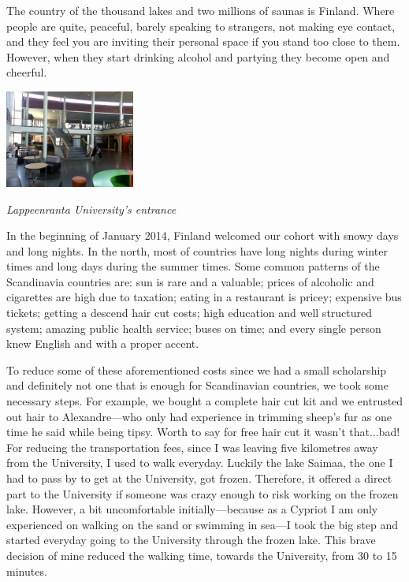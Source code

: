 \documentclass[10pt,a4paper]{article} %
\begin{document}
\begin{multicols}{3}
The country of the thousand lakes and two millions of saunas is Finland. 
Where people are quite, peaceful, barely speaking to strangers, not making eye 
contact, and they feel you are inviting their personal space if you stand too 
close to them. 
However, when they start drinking alcohol and partying they become open and cheerful. 
   
\begin{center}
	\includegraphics[width=0.32\textwidth]{media/entrance_university.jpg}
	\par\textit{Lappeenranta University's entrance}
\end{center}
   
In the beginning of January 2014, Finland welcomed our cohort with snowy days 
and long nights. 
In the north, most of countries have long nights during winter times and long 
days during the summer times. 
Some common patterns of the Scandinavia countries are: sun is rare and a valuable; 
prices of alcoholic and cigarettes are high due to taxation; eating in a 
restaurant is pricey; expensive bus tickets; getting a descend hair cut costs; 
high education and well structured system; amazing public health service; buses on time; 
and every single person knew English and with a proper accent.


To reduce some of these aforementioned costs since we had a small scholarship and 
definitely not one that is enough for Scandinavian countries, we took some 
necessary steps. 
For example, we bought a complete hair cut kit and we entrusted out hair to 
Alexandre---who only had experience in trimming sheep's fur as one time he said 
while being tipsy.  
Worth to say for free hair cut it wasn't that...bad! 
For reducing the transportation fees, since I was leaving five kilometres away from 
the University, I used to walk everyday. 
Luckily the lake Saimaa, the one I had to pass by to get at the University, got 
frozen. 
Therefore, it offered a direct part to the University if someone was crazy enough 
to risk working on the frozen lake. 
However, a bit uncomfortable initially---because as a Cypriot I am only experienced 
on walking on the sand or swimming in sea---I took the big step and started everyday 
going to the University through the frozen lake.
This brave decision of mine reduced the walking time, towards the University, from 
30 to 15 minutes.



\end{multicols}
\end{document}
